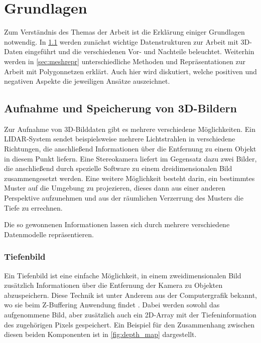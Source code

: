
\chapter{Grundlagen}
\label{ch:grundlagen}

Zum Verständnis des Themas der Arbeit ist die Erklärung einiger Grundlagen notwendig.
In \ref{sec:3d-bilder} werden zunächst wichtige Datenstrukturen zur Arbeit mit 3D-Daten eingeführt und die verschiedenen Vor- und Nachteile beleuchtet.
Weiterhin werden in \ref{sec:meshrepr} unterschiedliche Methoden und Repräsentationen zur Arbeit mit Polygonnetzen erklärt.
Auch hier wird diskutiert, welche positiven und negativen Aspekte die jeweiligen Ansätze auszeichnet.


\section{Aufnahme und Speicherung von 3D-Bildern}
\label{sec:3d-bilder}

Zur Aufnahme von 3D-Bilddaten gibt es mehrere verschiedene Möglichkeiten.
Ein LIDAR-System sendet beispielsweise mehrere Lichtstrahlen in verschiedene Richtungen, die anschließend Informationen über die Entfernung zu einem Objekt in diesem Punkt liefern.
Eine Stereokamera liefert im Gegensatz dazu zwei Bilder, die anschließend durch spezielle Software zu einem dreidimensionalen Bild zusammengesetzt werden.
Eine weitere Möglichkeit besteht darin, ein bestimmtes Muster auf die Umgebung zu projezieren, dieses dann aus einer anderen Perspektive aufzunehmen und aus der räumlichen Verzerrung des Musters die Tiefe zu errechnen.

Die so gewonnenen Informationen lassen sich durch mehrere verschiedene Datenmodelle repräsentieren.


\subsection{Tiefenbild}
\label{subsec:tiefenbild}

Ein Tiefenbild ist eine einfache Möglichkeit, in einem zweidimensionalen Bild zusätzlich Informationen über die Entfernung der Kamera zu Objekten abzuspeichern.
Diese Technik ist unter Anderem aus der Computergrafik bekannt, wo sie beim Z-Buffering Anwendung findet \cite[S.32]{catmull1974subdivision}.
Dabei werden sowohl das aufgenommene Bild, aber zusätzlich auch ein 2D-Array mit der Tiefeninformation des zugehörigen Pixels gespeichert.
Ein Beispiel für den Zusammenhang zwischen diesen beiden Komponenten ist in \autoref{fig:depth_map} dargestellt.

